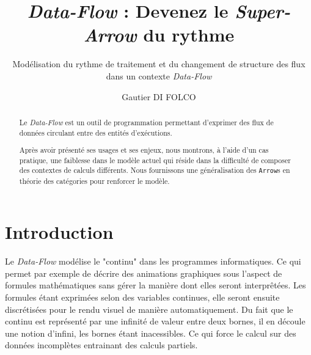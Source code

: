 \documentclass{llncs}
\newcommand{\DF}{\emph{Data-Flow} }
\newcommand{\SA}{\emph{Super-Arrow} }
\newcommand{\Arrs}{\texttt{Arrow}s }
\begin{document}
\title{\DF : Devenez le \SA du rythme}


\subtitle{Modélisation du rythme de traitement et du changement de structure des flux dans un contexte \DF}


\author{Gautier DI FOLCO}







\maketitle

\begin{abstract}
Le \DF est un outil de programmation permettant d'exprimer des flux de
données circulant entre des entités d'exécutions.

Après avoir présenté ses usages et ses enjeux, nous montrons, à l'aide d'un
cas pratique, une faiblesse dans le modèle actuel qui réside dans la difficulté
de composer des contextes de calculs différents.
Nous fournissons une généralisation des \Arrs en théorie des catégories pour
renforcer le modèle.
\end{abstract}

\section{Introduction}
Le \DF modélise le "continu" dans les programmes informatiques.
Ce qui permet par exemple de décrire des animations graphiques sous l'aspect de
formules mathématiques sans gérer la manière dont elles seront interprêtées.
Les formules étant exprimées selon des variables continues, elle seront ensuite
discrétisées pour le rendu visuel de manière automatiquement.
Du fait que le continu est représenté par une infinité de valeur entre deux bornes,
il en découle une notion d'infini, les bornes étant inacessibles.
Ce qui force le calcul sur des données incomplètes entrainant des calculs partiels.
\end{document}
